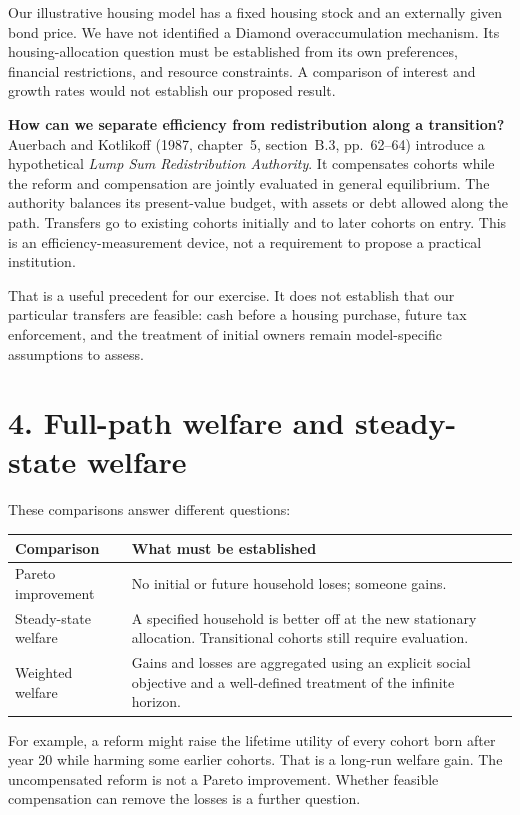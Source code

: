 \documentclass[11pt]{article}
\begin{document}
Our illustrative housing model has a fixed housing stock and an externally
given bond price. We have not identified a Diamond overaccumulation mechanism.
Its housing-allocation question must be established from its own preferences,
financial restrictions, and resource constraints. A comparison of interest
and growth rates would not establish our proposed result.

\textbf{How can we separate efficiency from redistribution along a transition?}
Auerbach and Kotlikoff (1987, chapter~5, section~B.3, pp.~62--64) introduce a
hypothetical \emph{Lump Sum Redistribution Authority}. It compensates cohorts
while the reform and compensation are jointly evaluated in general
equilibrium. The authority balances its present-value budget, with assets or
debt allowed along the path. Transfers go to existing cohorts initially and
to later cohorts on entry. This is an efficiency-measurement device, not a
requirement to propose a practical institution.

That is a useful precedent for our exercise. It does not establish that our
particular transfers are feasible: cash before a housing purchase, future
tax enforcement, and the treatment of initial owners remain model-specific
assumptions to assess.

\section*{4. Full-path welfare and steady-state welfare}

These comparisons answer different questions:

\begin{center}
\begin{tabular}{@{}p{}p{}@{}}
\toprule
Comparison & What must be established \\
\midrule
Pareto improvement & No initial or future household loses; someone gains. \\[5pt]
Steady-state welfare & A specified household is better off at the new stationary allocation. Transitional cohorts still require evaluation. \\[5pt]
Weighted welfare & Gains and losses are aggregated using an explicit social objective and a well-defined treatment of the infinite horizon. \\
\bottomrule
\end{tabular}
\end{center}

For example, a reform might raise the lifetime utility of every cohort born
after year 20 while harming some earlier cohorts. That is a long-run welfare
gain. The uncompensated reform is not a Pareto improvement. Whether feasible
compensation can remove the losses is a further question.
\end{document}
